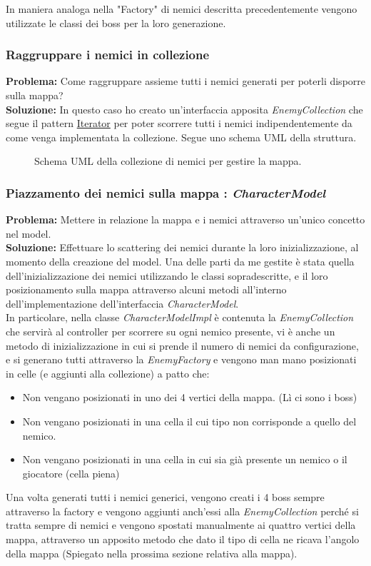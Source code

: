 \documentclass[a4paper,12pt]{report}
\begin{document}
In maniera analoga nella "Factory" di nemici descritta precedentemente vengono utilizzate le classi dei boss per la loro generazione.

\subsubsection{Raggruppare i nemici in collezione}
\textbf{Problema:} Come raggruppare assieme tutti i nemici generati per poterli disporre sulla mappa?\\
\textbf{Soluzione:} In questo caso ho creato un'interfaccia apposita \textit{EnemyCollection} che segue il pattern \href{https://refactoring.guru/design-patterns/iterator}{Iterator} per poter scorrere tutti i nemici indipendentemente da come venga implementata la collezione. Segue uno schema UML della struttura.

\begin{figure}[H]
	\centering
	
	\caption{Schema UML della collezione di nemici per gestire la mappa.}
	\label{fig:Schema UML della collezione di nemici per gestire la mappa.}
\end{figure}

\subsubsection{Piazzamento dei nemici sulla mappa : \textit{CharacterModel}}
\textbf{Problema:} Mettere in relazione la mappa e i nemici attraverso un'unico concetto nel model.\\
\textbf{Soluzione:} Effettuare lo scattering dei nemici durante la loro inizializzazione, al momento della creazione del model.
Una delle parti da me gestite è stata quella dell'inizializzazione dei nemici utilizzando le classi sopradescritte, e il loro posizionamento sulla mappa attraverso alcuni metodi all'interno dell'implementazione dell'interfaccia \textit{CharacterModel}.\\
In particolare, nella classe \textit{CharacterModelImpl} è contenuta la \textit{EnemyCollection} che servirà al controller per scorrere su ogni nemico presente, vi è anche un metodo di inizializzazione in cui si prende il numero di nemici da configurazione, e si generano tutti attraverso la \textit{EnemyFactory} e vengono man mano posizionati in celle (e aggiunti alla collezione) a patto che:
\begin{itemize}
	\item Non vengano posizionati in uno dei 4 vertici della mappa. (Lì ci sono i boss)
	\item Non vengano posizionati in una cella il cui tipo non corrisponde a quello del nemico.
	\item Non vengano posizionati in una cella in cui sia già presente un nemico o il giocatore (cella piena)
\end{itemize}
Una volta generati tutti i nemici generici, vengono creati i 4 boss sempre attraverso la factory e vengono aggiunti anch'essi alla \textit{EnemyCollection} perché si tratta sempre di nemici e vengono spostati manualmente ai quattro vertici della mappa, attraverso un apposito metodo che dato il tipo di cella ne ricava l'angolo della mappa (Spiegato nella prossima sezione relativa alla mappa).
\end{document}

